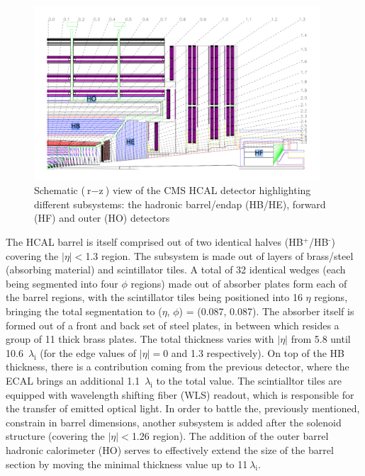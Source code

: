 \begin{figure}[htbp]
  \centering
    \includegraphics[width=0.95\textwidth]{CMS_experiment/HCAL_structure.png}
  \caption[Schematic ($\text{r}-\text{z}$) view of the CMS HCAL detector highlighting different subsystems: the hadronic barrel/endap (HB/HE), forward (HF) and outer (HO) detectors.]{Schematic ($\text{r}-\text{z}$) view of the CMS HCAL detector highlighting different subsystems: the hadronic barrel/endap (HB/HE), forward (HF) and outer (HO) detectors~\cite{cms:paper}}
  \label{fig:hcal}
\end{figure}

\hspace{10pt} The HCAL barrel is itself comprised out of two identical halves (HB$^{\text{+}}$/HB$^{\text{-}}$) covering the $|\eta|<$1.3 region. The subsystem is made out of layers of brass/steel (absorbing material) and scintillator tiles. A total of 32 identical wedges (each being segmented into four $\phi$ regions) made out of absorber plates form each of the barrel regions, with the scintillator tiles being positioned into 16 $\eta$ regions, bringing the total segmentation to ($\eta$, $\phi$) = (0.087, 0.087). The absorber itself is formed out of a front and back set of steel plates, in between which resides a group of 11 thick brass plates. The total thickness varies with $|\eta|$ from 5.8 until 10.6~$\lambda_{\text{i}}$ (for the edge values of $|\eta|=$0 and 1.3 respectively). On top of the HB thickness, there is a contribution coming from the previous detector, where the ECAL brings an additional 1.1~$\lambda_{\text{i}}$ to the total value. The scintialltor tiles are equipped with wavelength shifting fiber (WLS) readout, which is responsible for the transfer of emitted optical light. In order to battle the, previously mentioned, constrain in barrel dimensions, another subsystem is added after the solenoid structure (covering the $|\eta|<$1.26 region). The addition of the outer barrel hadronic calorimeter (HO) serves to effectively extend the size of the barrel section by moving the minimal thickness value up to 11$~\lambda_{\text{i}}$.


